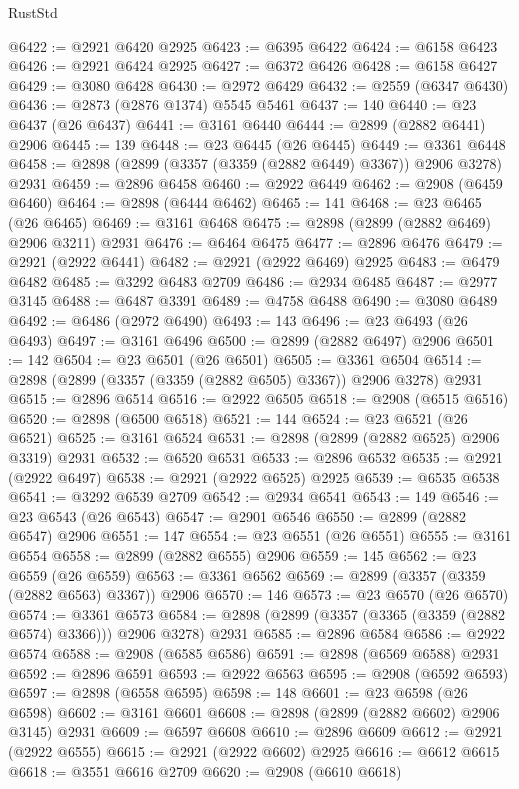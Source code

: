 \begin{lexlean}{RustStd}
\begin{coremodule}
@6422 := @2921 @6420 @2925
@6423 := @6395 @6422
@6424 := @6158 @6423
@6426 := @2921 @6424 @2925
@6427 := @6372 @6426
@6428 := @6158 @6427
@6429 := @3080 @6428
@6430 := @2972 @6429
@6432 := @2559 (@6347 @6430)
@6436 := @2873 (@2876 @1374) @5545 @5461
@6437 := 140
@6440 := @23 @6437 (@26 @6437)
@6441 := @3161 @6440
@6444 := @2899 (@2882 @6441) @2906
@6445 := 139
@6448 := @23 @6445 (@26 @6445)
@6449 := @3361 @6448
@6458 := @2898 (@2899 (@3357 (@3359 (@2882 @6449) @3367)) @2906 @3278) @2931
@6459 := @2896 @6458
@6460 := @2922 @6449
@6462 := @2908 (@6459 @6460)
@6464 := @2898 (@6444 @6462)
@6465 := 141
@6468 := @23 @6465 (@26 @6465)
@6469 := @3161 @6468
@6475 := @2898 (@2899 (@2882 @6469) @2906 @3211) @2931
@6476 := @6464 @6475
@6477 := @2896 @6476
@6479 := @2921 (@2922 @6441)
@6482 := @2921 (@2922 @6469) @2925
@6483 := @6479 @6482
@6485 := @3292 @6483 @2709
@6486 := @2934 @6485
@6487 := @2977 @3145
@6488 := @6487 @3391
@6489 := @4758 @6488
@6490 := @3080 @6489
@6492 := @6486 (@2972 @6490)
@6493 := 143
@6496 := @23 @6493 (@26 @6493)
@6497 := @3161 @6496
@6500 := @2899 (@2882 @6497) @2906
@6501 := 142
@6504 := @23 @6501 (@26 @6501)
@6505 := @3361 @6504
@6514 := @2898 (@2899 (@3357 (@3359 (@2882 @6505) @3367)) @2906 @3278) @2931
@6515 := @2896 @6514
@6516 := @2922 @6505
@6518 := @2908 (@6515 @6516)
@6520 := @2898 (@6500 @6518)
@6521 := 144
@6524 := @23 @6521 (@26 @6521)
@6525 := @3161 @6524
@6531 := @2898 (@2899 (@2882 @6525) @2906 @3319) @2931
@6532 := @6520 @6531
@6533 := @2896 @6532
@6535 := @2921 (@2922 @6497)
@6538 := @2921 (@2922 @6525) @2925
@6539 := @6535 @6538
@6541 := @3292 @6539 @2709
@6542 := @2934 @6541
@6543 := 149
@6546 := @23 @6543 (@26 @6543)
@6547 := @2901 @6546
@6550 := @2899 (@2882 @6547) @2906
@6551 := 147
@6554 := @23 @6551 (@26 @6551)
@6555 := @3161 @6554
@6558 := @2899 (@2882 @6555) @2906
@6559 := 145
@6562 := @23 @6559 (@26 @6559)
@6563 := @3361 @6562
@6569 := @2899 (@3357 (@3359 (@2882 @6563) @3367)) @2906
@6570 := 146
@6573 := @23 @6570 (@26 @6570)
@6574 := @3361 @6573
@6584 := @2898 (@2899 (@3357 (@3365 (@3359 (@2882 @6574) @3366))) @2906 @3278) @2931
@6585 := @2896 @6584
@6586 := @2922 @6574
@6588 := @2908 (@6585 @6586)
@6591 := @2898 (@6569 @6588) @2931
@6592 := @2896 @6591
@6593 := @2922 @6563
@6595 := @2908 (@6592 @6593)
@6597 := @2898 (@6558 @6595)
@6598 := 148
@6601 := @23 @6598 (@26 @6598)
@6602 := @3161 @6601
@6608 := @2898 (@2899 (@2882 @6602) @2906 @3145) @2931
@6609 := @6597 @6608
@6610 := @2896 @6609
@6612 := @2921 (@2922 @6555)
@6615 := @2921 (@2922 @6602) @2925
@6616 := @6612 @6615
@6618 := @3551 @6616 @2709
@6620 := @2908 (@6610 @6618)

\end{coremodule}
\end{lexlean}

